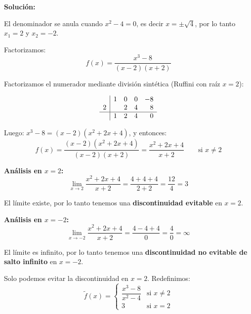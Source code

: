 \documentclass[12pt]{article}
\newcommand{\solucion}{%
    \vspace{0.8em}%
    \textbf{Solución:}%
}
\begin{document}
\begin{enumerate}[label=\alph*)]
    \solucion

    El denominador se anula cuando $x^2 - 4 = 0$, es decir $x = \pm\sqrt{4}$, por lo tanto $x_1 = 2$ y $x_2 = -2$.

    Factorizamos:
    \[
    f(x) = \frac{x^3 - 8}{(x-2)(x+2)}
    \]

    Factorizamos el numerador mediante división sintética (Ruffini con raíz $x=2$):

    \[
    \begin{array}{r|rrrr}
      & 1 & 0 & 0 & -8 \\
    2 & & 2 & 4 & 8 \\
    \hline
      & 1 & 2 & 4 & 0 \\
    \end{array}
    \]

    Luego: $x^3 - 8 = (x-2)(x^2 + 2x + 4)$, y entonces:
    \[
    f(x) = \frac{(x-2)(x^2+2x+4)}{(x-2)(x+2)} = \frac{x^2+2x+4}{x+2} \qquad \text{si } x \neq 2
    \]

    \textbf{Análisis en $x = 2$:}
    \[
    \lim_{x \to 2} \frac{x^2+2x+4}{x+2} = \frac{4+4+4}{2+2} = \frac{12}{4} = 3
    \]

    El límite existe, por lo tanto tenemos una \textbf{discontinuidad evitable} en $x = 2$.

    \textbf{Análisis en $x = -2$:}
    \[
    \lim_{x \to -2} \frac{x^2+2x+4}{x+2} = \frac{4-4+4}{0} = \frac{4}{0} = \infty
    \]

    El límite es infinito, por lo tanto tenemos una \textbf{discontinuidad no evitable de salto infinito} en $x = -2$.

    Solo podemos evitar la discontinuidad en $x = 2$. Redefinimos:
    \[
    \widetilde{f}(x) = \begin{cases} \dfrac{x^3 - 8}{x^2 - 4} & \text{si } x \neq 2 \\[0.5em] 3 & \text{si } x = 2 \end{cases}
    \]

    \begin{figure}[H]
    \centering
\end{figure}
\end{enumerate}
\end{document}
